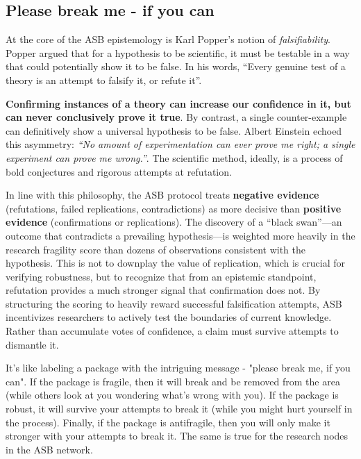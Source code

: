 \subsection{Please break me - if you can}
At the core of the ASB epistemology is Karl Popper's notion of \emph{falsifiability}\cite{Popper1963}. Popper argued that for a hypothesis to be scientific, it must be testable in a way that could potentially show it to be false. In his words, ``Every genuine test of a theory is an attempt to falsify it, or refute it''\cite{Popper1963}. 

\textbf{Confirming instances of a theory can increase our confidence in it, but can never conclusively prove it true}. By contrast, a single counter-example can definitively show a universal hypothesis to be false. Albert Einstein echoed this asymmetry: \emph{``No amount of experimentation can ever prove me right; a single experiment can prove me wrong.''}. The scientific method, ideally, is a process of bold conjectures and rigorous attempts at refutation.

In line with this philosophy, the ASB protocol treats \textbf{negative evidence} (refutations, failed replications, contradictions) as more decisive than \textbf{positive evidence} (confirmations or replications). The discovery of a ``black swan''---an outcome that contradicts a prevailing hypothesis---is weighted more heavily in the research fragility score than dozens of observations consistent with the hypothesis. This is not to downplay the value of replication, which is crucial for verifying robustness, but to recognize that from an epistemic standpoint, refutation provides a much stronger signal that confirmation does not. 
By structuring the scoring to heavily reward successful falsification attempts, ASB incentivizes researchers to actively test the boundaries of current knowledge. Rather than accumulate votes of confidence, a claim must survive attempts to dismantle it.

It's like labeling a package with the intriguing message - "please break me, if you can". If the package is fragile, then it will break and be removed from the area (while others look at you wondering what's wrong with you). If the package is robust, it will survive your attempts to break it (while you might hurt yourself in the process). Finally, if the package is antifragile, then you will only make it stronger with your attempts to break it. The same is true for the research nodes in the ASB network.
